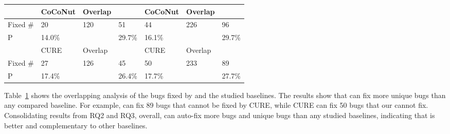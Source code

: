 {{\begin{table}[t]
\begin{center}
\begin{tabular}{p{0.8cm}<{\centering}|p{1.1cm}<{\centering}|p{0.8cm}<{\centering}|p{0.7cm}<{\centering}|p{1.1cm}<{\centering}|p{0.8cm}<{\centering}|p{0.7cm}<{\centering}}
			\hline
			             & CoCoNut   & Overlap   & \tool  & CoCoNut   & Overlap   & \tool \\
			\hline
			Fixed \#     & \cellcolor{mygray} 20  & 120   & \cellcolor{mygray} 51 & \cellcolor{mygray}44 &  226  & \cellcolor{mygray} 96\\
			P            &  14.0\%  &    &  29.7\% &  16.1\%  &    & 29.7\% \\
			\hline
			             & CURE   & Overlap   & \tool  & CURE   & Overlap   & \tool \\
			\hline
			Fixed \#     & \cellcolor{mygray} 27  &  126  & \cellcolor{mygray} 45 & \cellcolor{mygray} 50&  233  & \cellcolor{mygray} 89\\
			P            &  17.4\%  &    & 26.4\%  & 17.7\%   &    &  27.7\%\\
			\hline
		\end{tabular}
		\label{RQ3_results}
	\end{center}
\end{table}
}}


Table~\ref{RQ3_results} shows the overlapping analysis of the bugs fixed by {\tool} and the studied baselines. The results show that {\tool} can fix more unique bugs than any compared baseline. For example, {\tool} can fix 89 bugs that cannot be fixed by CURE, while CURE can fix 50 bugs that our {\tool} cannot fix. %
Consolidating results from RQ2 and RQ3, overall, {\tool} can auto-fix more bugs and unique bugs than any studied baselines, indicating that {\tool} is better and complementary to other baselines.

